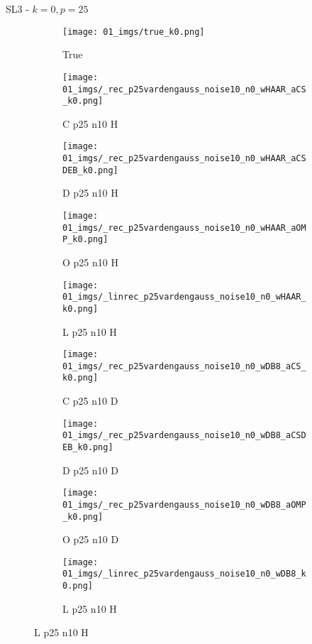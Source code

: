 \begin{frame}{SL3 - $k=0,p=25$}{}
\begin{figure}
\begin{subfigure}{0.1\textwidth}
\texttt{[image: 01\_imgs/true\_k0.png]}
\caption*{\Tiny True}
\end{subfigure}
\begin{subfigure}{0.1\textwidth}
\texttt{[image: 01\_imgs/\_rec\_p25vardengauss\_noise10\_n0\_wHAAR\_aCS\_k0.png]}
\caption*{\Tiny C p25 n10 H}
\end{subfigure}
\begin{subfigure}{0.1\textwidth}
\texttt{[image: 01\_imgs/\_rec\_p25vardengauss\_noise10\_n0\_wHAAR\_aCSDEB\_k0.png]}
\caption*{\Tiny D p25 n10 H}
\end{subfigure}
\begin{subfigure}{0.1\textwidth}
\texttt{[image: 01\_imgs/\_rec\_p25vardengauss\_noise10\_n0\_wHAAR\_aOMP\_k0.png]}
\caption*{\Tiny O p25 n10 H}
\end{subfigure}
\begin{subfigure}{0.1\textwidth}
\texttt{[image: 01\_imgs/\_linrec\_p25vardengauss\_noise10\_n0\_wHAAR\_k0.png]}
\caption*{\Tiny L p25 n10 H}
\end{subfigure}
\begin{subfigure}{0.1\textwidth}
\texttt{[image: 01\_imgs/\_rec\_p25vardengauss\_noise10\_n0\_wDB8\_aCS\_k0.png]}
\caption*{\Tiny C p25 n10 D}
\end{subfigure}
\begin{subfigure}{0.1\textwidth}
\texttt{[image: 01\_imgs/\_rec\_p25vardengauss\_noise10\_n0\_wDB8\_aCSDEB\_k0.png]}
\caption*{\Tiny D p25 n10 D}
\end{subfigure}
\begin{subfigure}{0.1\textwidth}
\texttt{[image: 01\_imgs/\_rec\_p25vardengauss\_noise10\_n0\_wDB8\_aOMP\_k0.png]}
\caption*{\Tiny O p25 n10 D}
\end{subfigure}
\begin{subfigure}{0.1\textwidth}
\texttt{[image: 01\_imgs/\_linrec\_p25vardengauss\_noise10\_n0\_wDB8\_k0.png]}
\caption*{\Tiny L p25 n10 H}
\end{subfigure}

\vspace{5pt}


\end{figure}
\end{frame}
